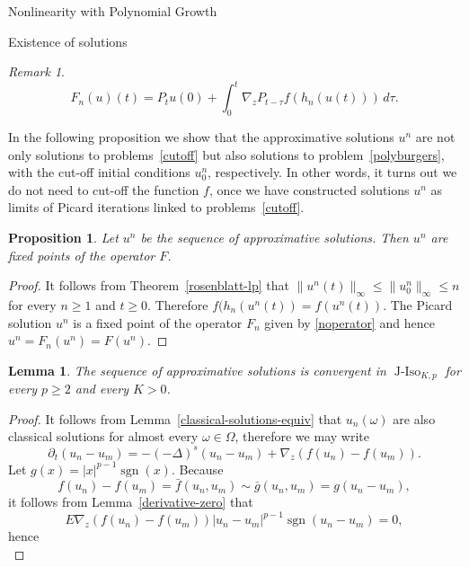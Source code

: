 \documentclass[a4paper,10pt,fleqn]{amsart}
\newtheorem{lemma}[theorem]{Lemma}
\newtheorem{proposition}[theorem]{Proposition}
\theoremstyle{remark}
\newtheorem{remark}[theorem]{Remark}
\theoremstyle{definition}
\DeclareMathOperator{\JIso}{J-Iso}
\DeclareMathOperator{\sgn}{sgn}
\newcommand{\dt} {\partial_t}
\newcommand{\grad} {\nabla_{\!z}}
\renewcommand{\=} {\overset{d}{=}}
\newcommand{\fLap} {(-\Delta)^s}
\begin{document}
\begin{section}{Nonlinearity with Polynomial Growth}
\begin{subsection}{Existence of solutions}
\begin{remark}
     \begin{equation}\label{noperator}
      F_n(u)(t) = P_{t}u(0) + \int_0^{t} \grad P_{t-\tau} f(h_n(u(t)))\,d\tau.
     \end{equation}
    \end{remark}
     In the following proposition we show that the approximative solutions $u^n$ are 
     not only solutions to problems~\eqref{cutoff} but also solutions
     to problem~\eqref{polyburgers}, with the cut-off initial conditions $u_0^n$, respectively.
     In other words, it turns out we do not need to cut-off the function $f$, once we have constructed
     solutions $u^n$ as limits of Picard iterations linked to problems~\eqref{cutoff}.
    \begin{proposition}
     Let $u^n$ be the sequence of approximative solutions.
     Then $u^n$ are fixed points of the operator $F$.
    \end{proposition}
    \begin{proof}
     It follows from Theorem~\ref{rosenblatt-lp} that $\|u^n(t)\|_\infty \leq \|u_0^n\|_\infty\leq n$ for every $n\geq1$ and $t\geq0$. Therefore $f(h_n(u^n(t)) = f(u^n(t))$.
     The Picard solution $u^n$ is a fixed point of the operator $F_n$ given by \eqref{noperator}
     and hence
     $u^n = F_n(u^n)=F(u^n)$.
    \end{proof}
    \begin{lemma}\label{l1}
        The sequence of approximative solutions is convergent in $\JIso_{K,p}$ for every $p\geq2$ and every $K>0$.
    \end{lemma}
    \begin{proof}
      It follows from Lemma~\ref{classical-solutions-equiv} that $u_n(\omega)$ are also classical solutions for almost
      every $\omega\in\Omega$, therefore we may write
      \begin{equation*}
            \dt(u_n-u_m) = -\fLap (u_n-u_m) + \grad(f(u_n)-f(u_m)).
        \end{equation*}
        Let $g(x)=|x|^{p-1}\sgn(x)$. Because
        \begin{equation*}
        f(u_n)-f(u_m) = \bar{f}(u_n,u_m)\sim \bar{g}(u_n,u_m) = g(u_n-u_m),
        \end{equation*}
        it follows from Lemma~\ref{derivative-zero} that
        \begin{equation*}
            E \grad (f(u_n)-f(u_m))|u_n-u_m|^{p-1}\sgn(u_n-u_m) =  0,
        \end{equation*}
     hence
       \begin{equation*}

\end{equation*}
\end{proof}
\end{subsection}
\end{section}
\end{document}
